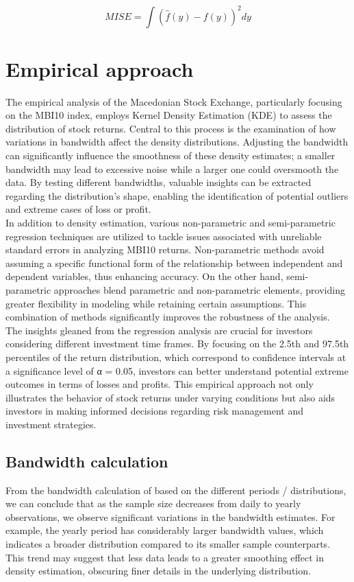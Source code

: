 \documentclass[]{article}
\begin{document}
	$$ MISE = \int (\hat{f}(y) - f(y))^2 dy $$
	
	\newpage
	
	\section{Empirical approach}
	The empirical analysis of the Macedonian Stock Exchange, particularly focusing on the MBI10 index, employs Kernel Density Estimation (KDE) to assess the distribution of stock returns. Central to this process is the examination of how variations in bandwidth affect the density distributions. Adjusting the bandwidth can significantly influence the smoothness of these density estimates; a smaller bandwidth may lead to excessive noise while a larger one could oversmooth the data. By testing different bandwidths, valuable insights can be extracted regarding the distribution's shape, enabling the identification of potential outliers and extreme cases of loss or profit.\\
	
	In addition to density estimation, various non-parametric and semi-parametric regression techniques are utilized to tackle issues associated with unreliable standard errors in analyzing MBI10 returns. Non-parametric methods avoid assuming a specific functional form of the relationship between independent and dependent variables, thus enhancing accuracy. On the other hand, semi-parametric approaches blend parametric and non-parametric elements, providing greater flexibility in modeling while retaining certain assumptions. This combination of methods significantly improves the robustness of the analysis.\\
	
	The insights gleaned from the regression analysis are crucial for investors considering different investment time frames. By focusing on the 2.5th and 97.5th percentiles of the return distribution, which correspond to confidence intervals at a significance level of α = 0.05, investors can better understand potential extreme outcomes in terms of losses and profits. This empirical approach not only illustrates the behavior of stock returns under varying conditions but also aids investors in making informed decisions regarding risk management and investment strategies.
	
	\subsection{Bandwidth calculation}
	From the bandwidth calculation of based on the different periods / distributions, we can conclude that as the sample size decreases from daily to yearly observations, we observe significant variations in the bandwidth estimates. For example, the yearly period has considerably larger bandwidth values, which indicates a broader distribution compared to its smaller sample counterparts. This trend may suggest that less data leads to a greater smoothing effect in density estimation, obscuring finer details in the underlying distribution.	
	
\end{document}
